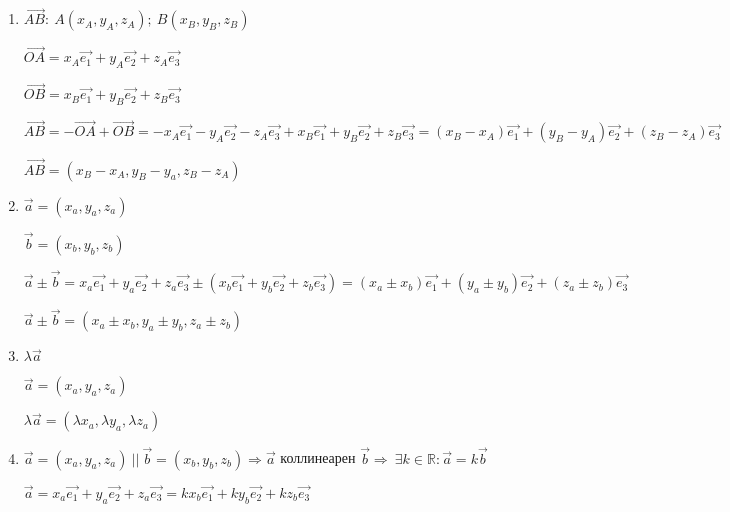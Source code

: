 \documentclass{article}
\begin{document}
    \begin{enumerate}
        \item \( \overrightarrow{AB}:\ A(x_A, y_A, z_A);\ B(x_B, y_B, z_B) \)

        \( \overrightarrow{OA} = x_A\overrightarrow{e_1} + y_A\overrightarrow{e_2} + z_A\overrightarrow{e_3} \)
        
        \( \overrightarrow{OB} = x_B\overrightarrow{e_1} + y_B\overrightarrow{e_2} + z_B\overrightarrow{e_3} \)

        \( \overrightarrow{AB} = -\overrightarrow{OA} + \overrightarrow{OB} =  -x_A\overrightarrow{e_1} - y_A\overrightarrow{e_2} - z_A\overrightarrow{e_3} + x_B\overrightarrow{e_1} + y_B\overrightarrow{e_2} + z_B\overrightarrow{e_3} = (x_B - x_A)\overrightarrow{e_1} + (y_B - y_A)\overrightarrow{e_2} + (z_B - z_A)\overrightarrow{e_3} \)

        \(\overrightarrow{AB} = (x_B - x_A, y_B - y_a, z_B - z_A)\)
        
        \item 
        
        \( \overrightarrow{a} = (x_a, y_a, z_a) \)
        
        \( \overrightarrow{b} = (x_b, y_b, z_b) \) 

        \( \overrightarrow{a} \pm \overrightarrow{b} = x_a\overrightarrow{e_1} + y_a\overrightarrow{e_2} + z_a\overrightarrow{e_3} \pm (x_b\overrightarrow{e_1} + y_b\overrightarrow{e_2} + z_b\overrightarrow{e_3})=(x_a \pm x_b)\overrightarrow{e_1} + (y_a \pm y_b)\overrightarrow{e_2} + (z_a \pm z_b)\overrightarrow{e_3} \)
        
        \(\overrightarrow{a}\pm\overrightarrow{b}=(x_a \pm x_b, y_a \pm y_b, z_a \pm z_b)\)
    
        \item \( \lambda\overrightarrow{a} \)
        
        \( \overrightarrow{a} = (x_a, y_a, z_a) \) 

        \( \lambda\overrightarrow{a} = (\lambda x_a, \lambda y_a, \lambda z_a) \)        

        \item \( \overrightarrow{a} = (x_a, y_a, z_a)\ ||\ \overrightarrow{b} = (x_b, y_b, z_b) \Rightarrow \overrightarrow{a}\) коллинеарен \(\overrightarrow{b} \Rightarrow\ \exists k \in \mathbb{R} : \overrightarrow{a} = k\overrightarrow{b}\)
    
        \( \overrightarrow{a} = x_a\overrightarrow{e_1} + y_a\overrightarrow{e_2} + z_a\overrightarrow{e_3} = kx_b\overrightarrow{e_1} + ky_b\overrightarrow{e_2} + kz_b\overrightarrow{e_3} \)


\end{enumerate}
\end{document}
